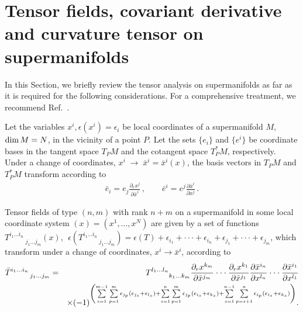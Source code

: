 \documentclass[a4paper,11pt]{article}
\begin{document}
\section{Tensor fields, covariant derivative and curvature tensor on\newline
supermanifolds}

In this Section, we briefly review the tensor analysis on
supermanifolds as far as it is required for the following
considerations. For a comprehensive treatment, we recommend
Ref.~\cite{DeWitt}.

Let the variables $x^{i},\epsilon (x^{i})=\epsilon _{i}$ be local
coordinates of a supermanifold $M$, ${\rm dim}\,M=N$, in the
vicinity of a point $P$. Let the sets $\{e_{i}\}$ and $\{e^{i}\}$
be coordinate bases in the tangent space $T_{P}M$ and the
cotangent space $T_{P}^{\ast }M$, respectively. Under a change of
coordinates, $x^i\; \rightarrow \;{\bar{x}}^{i}={\bar{x}}^{i}(x)$,
the basis vectors in $T_{P}M$ and $T_{P}^{\ast }M$ transform
according to
\begin{eqnarray}
\label{vec}
 {\bar e}_i=e_j \frac{\partial_r x^j}{\partial {\bar x}^i}\,,
 \qquad
 {\bar e}^i=e^j \frac{\partial {\bar x}^i}{\partial x^j}\,.
\end{eqnarray}

Tensor fields of type $(n,m)$ with rank $n+m$ on a supermanifold in some
local coordinate system $(x)=(x^{1},...,x^{N})$ are given by a set of
functions $T_{\;\;\;\;\;\;\;\;\;\;j_{1}...j_{m}}^{i_{1}\ldots i_{n}}(x)$, $%
\;\epsilon (T_{\;\;\;\;\;\;\;\;\;\;j_{1}...j_{m}}^{i_{1}\ldots
i_{n}})=\epsilon (T)+\epsilon _{i_{1}}+\cdot \cdot \cdot +\epsilon
_{i_{n}}+\epsilon _{j_{1}}+\cdot \cdot \cdot +\epsilon _{j_{m}}$, which
transform under a change of coordinates, $x^{i}\rightarrow {\bar{x}}^{i}$,
according to
\begin{eqnarray}
{\bar{T}}_{\;\;\;\;\;\;\;\;\;\;\;j_{1}...j_{m}}^{i_{1}...i_{n}}
&=&T_{\;\;\;\;\;\;\;\;\;\;k_{1}...k_{m}}^{l_{1}...l_{n}}\frac{\partial
_{r}x^{k_{m}}}{\partial {\bar{x}}^{j_{m}}}\cdot \cdot \cdot \frac{\partial
_{r}x^{k_{1}}}{\partial {\bar{x}}^{j_{1}}}\frac{\partial {\bar{x}}^{i_{n}}}{%
\partial x^{l_{n}}}\cdot \cdot \cdot \frac{\partial {\bar{x}}^{i_{1}}}{%
\partial x^{l_{1}}}  \label{tenzor} \\
&&\times (-1)^{\left( \sum\limits_{s=1}^{m-1}\sum\limits_{p=1}^{m}\epsilon
_{j_{p}}(\epsilon _{j_{s}}+\epsilon
_{l_{s}})+\sum\limits_{s=1}^{n}\sum\limits_{p=1}^{m}\epsilon
_{j_{p}}(\epsilon _{i_{s}}+\epsilon
_{k_{s}})+\sum\limits_{s=1}^{n-1}\sum\limits_{p=s+1}^{n}\epsilon
_{i_{p}}(\epsilon _{i_{s}}+\epsilon _{k_{s}})\right) }.  \nonumber
\end{eqnarray}
\end{document}
